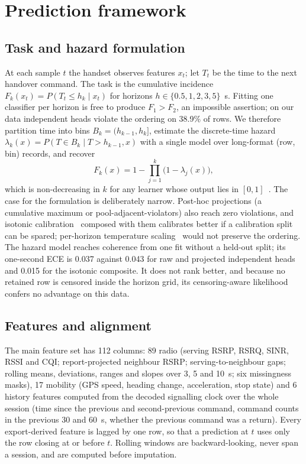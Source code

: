 \documentclass[5p,times,twocolumn]{elsarticle}
\begin{document}
\section{Prediction framework}
\label{sec:framework}

\subsection{Task and hazard formulation}
At each sample $t$ the handset observes features $x_t$; let $T_t$ be the time to the next handover command. The task is the cumulative incidence $F_k(x_t) = P(T_t \le h_k \mid x_t)$ for horizons $h \in \{0.5, 1, 2, 3, 5\}$~s. Fitting one classifier per horizon is free to produce $F_1 > F_2$, an impossible assertion; on our data independent heads violate the ordering on 38.9\% of rows. We therefore partition time into bins $B_k = (h_{k-1}, h_k]$, estimate the discrete-time hazard $\lambda_k(x) = P(T \in B_k \mid T > h_{k-1}, x)$ with a single model over long-format (row, bin) records, and recover
\begin{equation}
F_k(x) = 1 - \prod_{j=1}^{k} \bigl(1 - \lambda_j(x)\bigr),
\label{eq:hazard}
\end{equation}
which is non-decreasing in $k$ for any learner whose output lies in $[0,1]$~\cite{ref48,ref49,ref50}. The case for the formulation is deliberately narrow. Post-hoc projections (a cumulative maximum or pool-adjacent-violators) also reach zero violations, and isotonic calibration~\cite{ref34} composed with them calibrates better if a calibration split can be spared; per-horizon temperature scaling~\cite{ref33} would not preserve the ordering. The hazard model reaches coherence from one fit without a held-out split; its one-second ECE is 0.037 against 0.043 for raw and projected independent heads and 0.015 for the isotonic composite. It does not rank better, and because no retained row is censored inside the horizon grid, its censoring-aware likelihood confers no advantage on this data.

\subsection{Features and alignment}
The main feature set has 112 columns: 89 radio (serving RSRP, RSRQ, SINR, RSSI and CQI; report-projected neighbour RSRP; serving-to-neighbour gaps; rolling means, deviations, ranges and slopes over 3, 5 and 10~s; six missingness masks), 17 mobility (GPS speed, heading change, acceleration, stop state) and 6 history features computed from the decoded signalling clock over the whole session (time since the previous and second-previous command, command counts in the previous 30 and 60~s, whether the previous command was a return). Every export-derived feature is lagged by one row, so that a prediction at $t$ uses only the row closing at or before $t$. Rolling windows are backward-looking, never span a session, and are computed before imputation.
\end{document}
